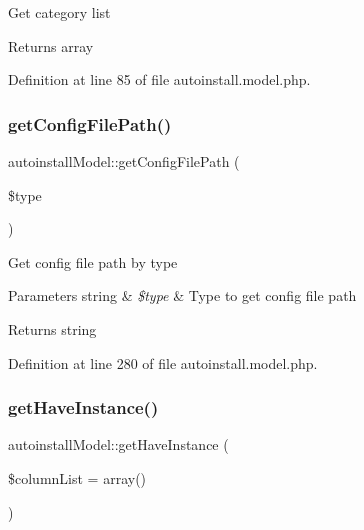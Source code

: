 Get category list

\begin{DoxyReturn}{Returns}
array 
\end{DoxyReturn}


Definition at line 85 of file autoinstall.\+model.\+php.

\mbox{\label{classautoinstallModel_afc9baa56522814866589ebe952041a43}} 
\subsubsection{\texorpdfstring{get\+Config\+File\+Path()}{getConfigFilePath()}}
{\footnotesize\ttfamily autoinstall\+Model\+::get\+Config\+File\+Path (\begin{DoxyParamCaption}\item[{}]{\$type }\end{DoxyParamCaption})}

Get config file path by type


\begin{DoxyParams}[1]{Parameters}
string & {\em \$type} & Type to get config file path \\
\hline
\end{DoxyParams}
\begin{DoxyReturn}{Returns}
string 
\end{DoxyReturn}


Definition at line 280 of file autoinstall.\+model.\+php.

\mbox{\label{classautoinstallModel_ac2f036319c53b9a9392a7b4534fef4fd}} 
\subsubsection{\texorpdfstring{get\+Have\+Instance()}{getHaveInstance()}}
{\footnotesize\ttfamily autoinstall\+Model\+::get\+Have\+Instance (\begin{DoxyParamCaption}\item[{}]{\$column\+List = {\ttfamily array()} }\end{DoxyParamCaption})}



